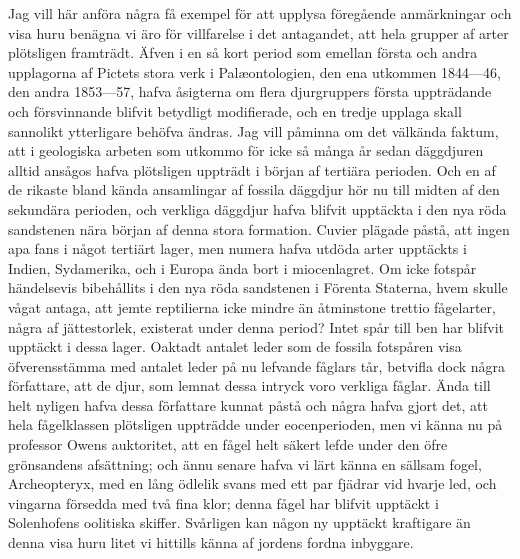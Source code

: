 Jag vill här anföra några få exempel för att upplysa föregående anmärkningar och visa huru benägna vi äro för villfarelse i det antagandet, att hela grupper af arter plötsligen framträdt. Äfven i en så kort period som emellan första och andra upplagorna af Pictets stora verk i Palæontologien, den ena utkommen 1844—46, den andra 1853—57, hafva åsigterna om flera djurgruppers första uppträdande och försvinnande blifvit betydligt modifierade, och en tredje upplaga skall sannolikt ytterligare behöfva ändras. Jag vill påminna om det välkända faktum, att i geologiska arbeten som utkommo för icke så många år sedan däggdjuren alltid ansågos hafva plötsligen uppträdt i början af tertiära perioden. Och en af de rikaste bland kända ansamlingar af fossila däggdjur hör nu till midten af den sekundära perioden, och verkliga däggdjur hafva blifvit upptäckta i den nya röda sandstenen nära början af denna stora formation. Cuvier plägade påstå, att ingen apa fans i något tertiärt lager, men numera hafva utdöda arter upptäckts i Indien, Sydamerika, och i Europa ända bort i miocenlagret. Om icke fotspår händelsevis bibehållits i den nya röda sandstenen i Förenta Staterna, hvem skulle vågat antaga, att jemte reptilierna icke mindre än åtminstone trettio fågelarter, några af jättestorlek, existerat under denna period? Intet spår till ben har blifvit upptäckt i dessa lager. Oaktadt antalet leder som de fossila fotspåren visa öfverensstämma med antalet leder på nu lefvande fåglars tår, betvifla dock några författare, att de djur, som lemnat dessa intryck voro verkliga fåglar. Ända till helt nyligen hafva dessa författare kunnat påstå och några hafva gjort det, att hela fågelklassen plötsligen uppträdde under eocenperioden, men vi känna nu på professor Owens auktoritet, att en fågel helt säkert lefde under den öfre grönsandens afsättning; och ännu senare hafva vi lärt känna en sällsam fogel, Archeopteryx, med en lång ödlelik svans med ett par fjädrar vid hvarje led, och vingarna försedda med två fina klor; denna fågel har blifvit upptäckt i Solenhofens oolitiska skiffer. Svårligen kan någon ny upptäckt kraftigare än denna visa huru litet vi hittills känna af jordens fordna inbyggare.


